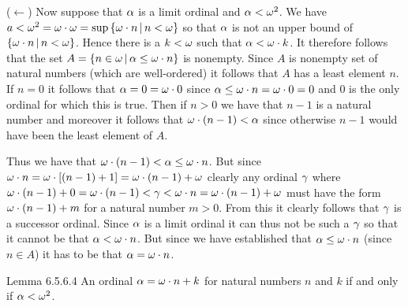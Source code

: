 \begin{solution}
{        ($\leftarrow$) Now suppose that $\alpha$ is a limit ordinal and $\alpha < \omega^2$.
        We have $a < \omega^2 = \omega \cdot \omega = \sup\left\{ \omega \cdot n \,|\, n < \omega \right\}$ so that $\alpha$ is not an upper bound of $\left\{ \omega \cdot n \,|\, n < \omega \right\}$.
        Hence there is a $k < \omega$ such that $\alpha < \omega \cdot k$.
        It therefore follows that the set $A = \left\{ n \in \omega \,|\, \alpha \leq \omega \cdot n \right\}$ is nonempty.
        Since $A$ is nonempty set of natural numbers (which are well-ordered) it follows that $A$ has a least element $n$.
        If $n=0$ it follows that $\alpha = 0 = \omega \cdot 0$ since $\alpha \leq \omega \cdot n = \omega \cdot 0 = 0$ and $0$ is the only ordinal for which this is true.
        Then if $n > 0$ we have that $n-1$ is a natural number and moreover it follows that $\omega \cdot (n-1) < \alpha$ since otherwise $n-1$ would have been the least element of $A$.

        Thus we have that $\omega \cdot (n-1) < \alpha \leq \omega \cdot n$.
        But since $\omega \cdot n = \omega \cdot\left[ (n-1) + 1 \right] = \omega \cdot (n-1) + \omega$ clearly any ordinal $\gamma$ where $\omega \cdot (n-1) + 0 = \omega \cdot (n-1) < \gamma < \omega \cdot n = \omega \cdot (n-1) + \omega$ must have the form $\omega \cdot (n-1) + m$ for a natural number $m > 0$.
        From this it clearly follows that $\gamma$ is a successor ordinal.
        Since $\alpha$ is a limit ordinal it can thus not be such a $\gamma$ so that it cannot be that $\alpha < \omega \cdot n$.
        But since we have established that $\alpha \leq \omega \cdot n$ (since $n \in A$) it has to be that $\alpha = \omega \cdot n$. \qedsymbol
    }

    \begin{statement}{Lemma 6.5.6.4}
        An ordinal $\alpha = \omega \cdot n + k$ for natural numbers $n$ and $k$ if and only if $\alpha < \omega^2$.
    \end{statement}

\end{solution}
